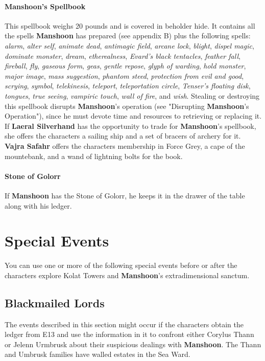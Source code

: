 \documentclass[10pt,a4paper,twoside,twocolumn,openany,nodeprecatedcode]{dndbook}
\begin{document}
\paragraph{Manshoon's Spellbook}
This spellbook weighs 20 pounds and is covered in beholder hide. It contains all the spells \textbf{Manshoon} has prepared (see appendix B) plus the following spells: \textit{alarm}, \textit{alter self}, \textit{animate dead}, \textit{antimagic field}, \textit{arcane lock}, \textit{blight}, \textit{dispel magic}, \textit{dominate monster}, \textit{dream}, \textit{etherealness}, \textit{Evard's black tentacles}, \textit{feather fall}, \textit{fireball}, \textit{fly}, \textit{gaseous form}, \textit{geas}, \textit{gentle repose}, \textit{glyph of warding}, \textit{hold monster}, \textit{major image}, \textit{mass suggestion}, \textit{phantom steed}, \textit{protection from evil and good}, \textit{scrying}, \textit{symbol}, \textit{telekinesis}, \textit{teleport}, \textit{teleportation circle}, \textit{Tenser's floating disk}, \textit{tongues}, \textit{true seeing}, \textit{vampiric touch}, \textit{wall of fire}, and \textit{wish}. Stealing or destroying this spellbook disrupts \textbf{Manshoon}'s operation (see "Disrupting \textbf{Manshoon}'s Operation"), since he must devote time and resources to retrieving or replacing it.
If \textbf{Laeral Silverhand} has the opportunity to trade for \textbf{Manshoon}'s spellbook, she offers the characters a sailing ship and a set of bracers of archery for it. \textbf{Vajra Safahr} offers the characters membership in Force Grey, a cape of the mountebank, and a wand of lightning bolts for the book.
\paragraph{Stone of Golorr}
If \textbf{Manshoon} has the Stone of Golorr, he keeps it in the drawer of the table along with his ledger.
\section{Special Events}
You can use one or more of the following special events before or after the characters explore Kolat Towers and \textbf{Manshoon}'s extradimensional sanctum.
\subsection{Blackmailed Lords}
The events described in this section might occur if the characters obtain the ledger from E13 and use the information in it to confront either Corylus Thann or Jelenn Urmbrusk about their suspicious dealings with \textbf{Manshoon}. The Thann and Umbrusk families have walled estates in the Sea Ward.
\end{document}
